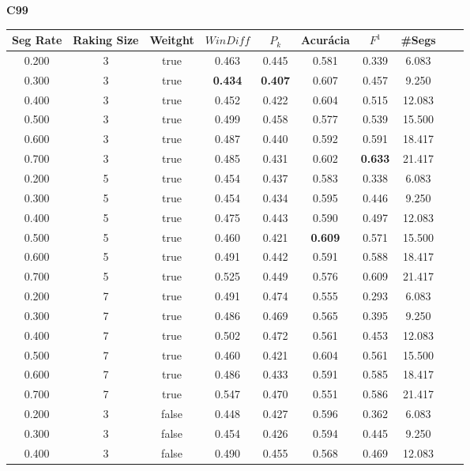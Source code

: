 \center
\textbf{C99}  
\begin{longtable}[c]{|c|c|c|c|c|c|c|c|c|c|} 
\hline 
 Seg Rate & Raking Size & Weitght & $WinDiff$ & $P_k$ & Acurácia & $F^1$ & \#Segs\\ \hline 
 0.200 & 3 & true & 0.463 & 0.445 & 0.581 & 0.339 & 6.083  \\ \hline 
 0.300 & 3 & true & \cellcolor{gray!20} \textbf{0.434} & \cellcolor{gray!20} \textbf{0.407} & 0.607 & 0.457 & 9.250  \\ \hline 
 0.400 & 3 & true & 0.452 & 0.422 & 0.604 & 0.515 & 12.083  \\ \hline 
 0.500 & 3 & true & 0.499 & 0.458 & 0.577 & 0.539 & 15.500  \\ \hline 
 0.600 & 3 & true & 0.487 & 0.440 & 0.592 & 0.591 & 18.417  \\ \hline 
 0.700 & 3 & true & 0.485 & 0.431 & 0.602 & \cellcolor{gray!20} \textbf{0.633} & 21.417  \\ \hline 
 0.200 & 5 & true & 0.454 & 0.437 & 0.583 & 0.338 & 6.083  \\ \hline 
 0.300 & 5 & true & 0.454 & 0.434 & 0.595 & 0.446 & 9.250  \\ \hline 
 0.400 & 5 & true & 0.475 & 0.443 & 0.590 & 0.497 & 12.083  \\ \hline 
 0.500 & 5 & true & 0.460 & 0.421 & \cellcolor{gray!20} \textbf{0.609} & 0.571 & 15.500  \\ \hline 
 0.600 & 5 & true & 0.491 & 0.442 & 0.591 & 0.588 & 18.417  \\ \hline 
 0.700 & 5 & true & 0.525 & 0.449 & 0.576 & 0.609 & 21.417  \\ \hline 
 0.200 & 7 & true & 0.491 & 0.474 & 0.555 & 0.293 & 6.083  \\ \hline 
 0.300 & 7 & true & 0.486 & 0.469 & 0.565 & 0.395 & 9.250  \\ \hline 
 0.400 & 7 & true & 0.502 & 0.472 & 0.561 & 0.453 & 12.083  \\ \hline 
 0.500 & 7 & true & 0.460 & 0.421 & 0.604 & 0.561 & 15.500  \\ \hline 
 0.600 & 7 & true & 0.486 & 0.433 & 0.591 & 0.585 & 18.417  \\ \hline 
 0.700 & 7 & true & 0.547 & 0.470 & 0.551 & 0.586 & 21.417  \\ \hline 
 0.200 & 3 & false & 0.448 & 0.427 & 0.596 & 0.362 & 6.083  \\ \hline 
 0.300 & 3 & false & 0.454 & 0.426 & 0.594 & 0.445 & 9.250  \\ \hline 
 0.400 & 3 & false & 0.490 & 0.455 & 0.568 & 0.469 & 12.083  \\ \hline 

\end{longtable}
